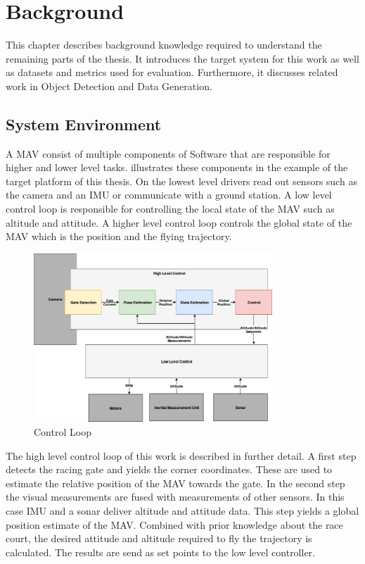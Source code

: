 \chapter{Background}
\label{sec:metrics}

This chapter describes background knowledge required to understand the remaining parts of the thesis. It introduces the target system for this work as well as datasets and metrics used for evaluation. Furthermore, it discusses related work in Object Detection and Data Generation.

\section{System Environment}

A \ac{MAV} consist of multiple components of Software that are responsible for higher and lower level tasks.  illustrates these components in the example of the target platform of this thesis. On the lowest level drivers read out sensors such as the camera and an \ac{IMU} or communicate with a ground station. A low level control loop is responsible for controlling the local state of the \ac{MAV} such as altitude and attitude. A higher level control loop controls the global state of the \ac{MAV} which is the position and the flying trajectory.


\begin{figure}[hbtp]
	\centering
	\includegraphics[width=0.8\textwidth]{fig/control_loop}
	\caption{Control Loop}
	\label{fig:control_loop}
\end{figure}

The high level control loop of this work is described in further detail. A first step detects the racing gate and yields the corner coordinates. These are used to estimate the relative position of the \ac{MAV} towards the gate. In the second step the visual measurements are fused with measurements of other sensors. In this case \ac{IMU} and a sonar deliver altitude and attitude data. This step yields a global position estimate of the \ac{MAV}. Combined with prior knowledge about the race court, the desired attitude and altitude required to fly the trajectory is calculated. The results are send as set points to the low level controller.

